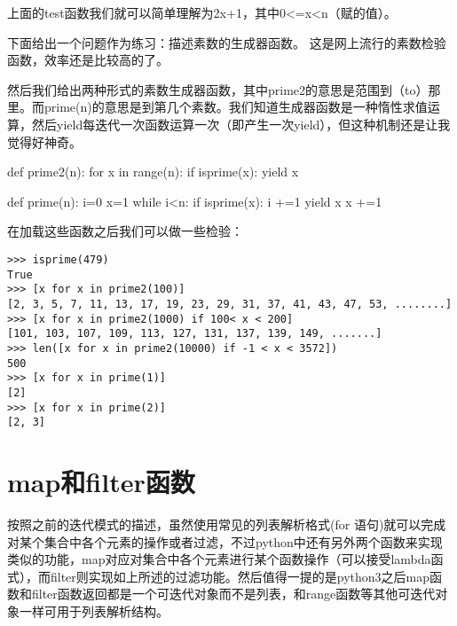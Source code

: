 \documentclass[12pt,oneside]{book}
\begin{document}
\begin{common-format}
上面的test函数我们就可以简单理解为2x+1，其中0<=x<n（赋的值）。

下面给出一个问题作为练习：描述素数的生成器函数。
这是网上流行的素数检验函数，效率还是比较高的了。

然后我们给出两种形式的素数生成器函数，其中prime2的意思是范围到（to）那里。而prime(n)的意思是到第几个素数。我们知道生成器函数是一种惰性求值运算，然后yield每迭代一次函数运算一次（即产生一次yield），但这种机制还是让我觉得好神奇。

\begin{tcbpython}
def prime2(n):
    for x in range(n):
        if isprime(x):
            yield x

def prime(n):
    i=0
    x=1
    while i<n:
        if isprime(x):
            i +=1
            yield x
        x +=1
\end{tcbpython}

在加载这些函数之后我们可以做一些检验：
\begin{Verbatim}
>>> isprime(479)
True
>>> [x for x in prime2(100)]
[2, 3, 5, 7, 11, 13, 17, 19, 23, 29, 31, 37, 41, 43, 47, 53, ........]
>>> [x for x in prime2(1000) if 100< x < 200]
[101, 103, 107, 109, 113, 127, 131, 137, 139, 149, .......]
>>> len([x for x in prime2(10000) if -1 < x < 3572])
500
>>> [x for x in prime(1)]
[2]
>>> [x for x in prime(2)]
[2, 3]
\end{Verbatim}



\section{map和filter函数}
按照之前的迭代模式的描述，虽然使用常见的列表解析格式(for 语句)就可以完成对某个集合中各个元素的操作或者过滤，不过python中还有另外两个函数来实现类似的功能，map对应对集合中各个元素进行某个函数操作（可以接受lambda函式），而filter则实现如上所述的过滤功能。然后值得一提的是python3之后map函数和filter函数返回都是一个可迭代对象而不是列表，和range函数等其他可迭代对象一样可用于列表解析结构。


\end{common-format}
\end{document}
